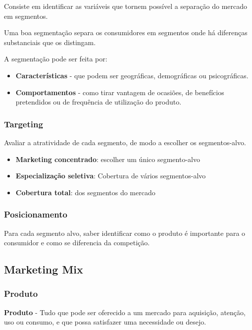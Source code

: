 \documentclass[11pt]{article}
\begin{document}
Consiste em identificar as variáveis que tornem possível a separação do mercado em segmentos.

Uma boa segmentação separa os consumidores em segmentos onde há diferenças substanciais que os distingam.

A segmentação pode ser feita por:
\begin{itemize}[topsep=0pt]
    \item \textbf{Características} - que podem ser geográficas, demográficas ou psicográficas.
    \item \textbf{Comportamentos} - como tirar vantagem de ocasiões, de benefícios pretendidos ou de frequência de utilização do produto.
\end{itemize}

\subsubsection{Targeting}

Avaliar a atratividade de cada segmento, de modo a escolher os segmentos-alvo.
\begin{itemize}[topsep=0pt]
    \item \textbf{Marketing concentrado}: escolher um único segmento-alvo
    \item \textbf{Especialização seletiva}: Cobertura de vários segmentos-alvo
    \item \textbf{Cobertura total}: dos segmentos do mercado
\end{itemize}

\subsubsection{Posicionamento}

Para cada segmento alvo, saber identificar como o produto é importante para
o consumidor e como se diferencia da competição.

\subsection{Marketing Mix}

\subsubsection{Produto}

\textbf{Produto} - Tudo que pode ser oferecido a um mercado para aquisição, atenção, uso ou consumo, e que possa satisfazer uma necessidade ou desejo.
\end{document}
